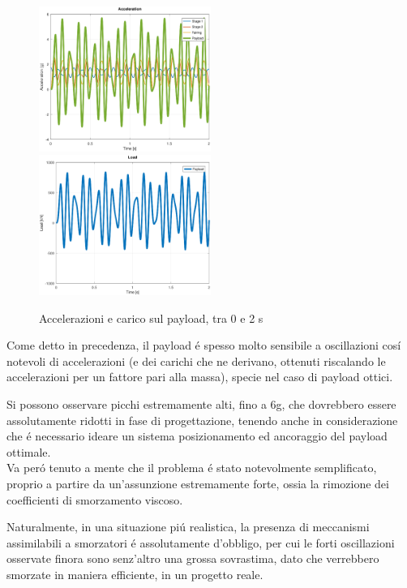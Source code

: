 \documentclass{article}
\begin{document}
        \begin{figure}[h!]
             \label{fig:acc_load}
            \includegraphics[width=0.5\textwidth]{MUL2/Esercitazione2/Matlab/acceleration.eps}
            \includegraphics[width=0.5\textwidth]{MUL2/Esercitazione2/Matlab/load.eps}
            \caption{Accelerazioni e carico sul payload, tra 0 e 2 s}
        \end{figure}

        Come detto in precedenza, il payload é spesso molto sensibile a oscillazioni cosí notevoli di 
        accelerazioni (e dei carichi che ne derivano, ottenuti riscalando le accelerazioni per un fattore pari alla massa), 
        specie nel caso di payload ottici. 

        Si possono osservare picchi estremamente alti, fino a 6g, che dovrebbero essere assolutamente ridotti
        in fase di progettazione, tenendo anche in considerazione che é necessario ideare un sistema
        posizionamento ed ancoraggio del payload ottimale. \\ 

        Va peró tenuto a mente che il problema é stato notevolmente semplificato, proprio a partire da un'assunzione
        estremamente forte, ossia la rimozione dei coefficienti di smorzamento viscoso.

        Naturalmente, in una situazione piú realistica, la presenza di meccanismi assimilabili a smorzatori 
        é assolutamente d'obbligo, per cui le forti oscillazioni osservate finora sono senz'altro una grossa
        sovrastima, dato che verrebbero smorzate in maniera efficiente, in un progetto reale.
\end{document}
